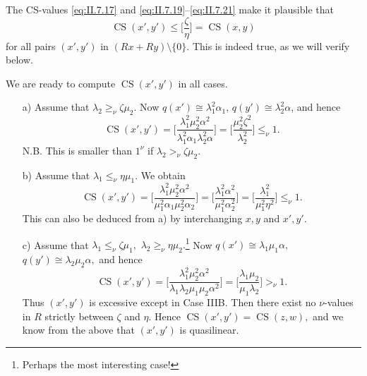 \documentclass [12pt,a4paper,reqno]{amsart}
\begin{document}
The CS-values \eqref{eq:II.7.17} and \eqref{eq:II.7.19}--\eqref{eq:II.7.21} make it plausible that
\begin{equation}\label{eq:II.7.22}
{\operatorname{CS}}(x',y') \leq \bigg[ \frac{\zeta}{\eta} \bigg] = {\operatorname{CS}}(x,y)
\end{equation}
for all pairs $(x',y')$ in $(Rx + Ry) {\setminus} \{ 0 \} .$  This is indeed true, as we will verify below.

{\vskip 1.5mm \noindent}

We are ready to compute  ${\operatorname{CS}}(x', y')$ in all cases.
\begin{enumerate}
  \item[a)] Assume that ${\lambda}_2 {\geq_\nu} {\zeta} \mu_2$. Now $q(x') \cong {\lambda}_1^2 {\alpha}_1$,
  $q(y') \cong {\lambda}_2^2 {\alpha}$, and hence
\begin{equation}\label{eq:II.7.23}
{\operatorname{CS}}(x',y') = \bigg[ \frac{{\lambda}_1 ^2  \mu_2 ^2 {\alpha}^2}{ {\lambda}_1^2 {\alpha}_1 {\lambda}_2^2 {\alpha} } \bigg]  =
\bigg[ \frac{ \mu_2 ^2 {\zeta} ^2}{{\lambda}_2^2 } \bigg] {\leq_\nu} 1.
\end{equation}
 N.B. This is smaller than $1^\nu$ if ${\lambda}_2 {>_\nu} {\zeta} \mu_2.$
{\vskip 1.5mm \noindent}

  \item[b)] Assume that ${\lambda}_1 {\leq_\nu} \eta \mu_1.$ We obtain
\begin{equation}\label{eq:II.7.24}
{\operatorname{CS}}(x',y') = \bigg[ \frac{{\lambda}_1 ^2  \mu_2 ^2 {\alpha}^2}{ \mu_1^2 {\alpha}_1 \mu_2^2 {\alpha}_2 } \bigg]  =
\bigg[ \frac{ {\lambda}_1 ^2 {\alpha} ^2}{\mu_1^2 {\alpha}_2^2 } \bigg] =
\bigg[ \frac{ {\lambda}_1 ^2 }{\mu_1^2 \eta^2 } \bigg] {\leq_\nu} 1.
\end{equation}
This can also be deduced from a) by interchanging $x,y$ and $x',y'$.
{\vskip 1.5mm \noindent}

  \item[c)] Assume that ${\lambda}_1 {\leq_\nu} {\zeta} \mu_1,$ ${\lambda}_2 {\geq_\nu} \eta \mu_2.$\footnote{Perhaps the most interesting case!}
  Now   $q(x') \cong {\lambda}_1 \mu_1 {\alpha} , $  $q(y') \cong {\lambda}_2 \mu_2 {\alpha},$ and hence
\begin{equation}\label{eq:II.7.25}
{\operatorname{CS}}(x',y') = \bigg[ \frac{{\lambda}_1 ^2  \mu_2 ^2 {\alpha}^2}{{\lambda}_1 {\lambda}_2  \mu_1  \mu_2 {\alpha}^2 } \bigg]  =
\bigg[ \frac{ {\lambda}_1 \mu_2 }{\mu_1 {\lambda}_2 } \bigg] {>_\nu} 1.
\end{equation}
Thus $(x',y')$ is excessive except in Case IIIB. Then there exist no $\nu$-values in $R$ strictly between ${\zeta}$ and $\eta$. Hence ${\operatorname{CS}}(x', y') = {\operatorname{CS}}(z,w),$ and we know from the above that $(x',y')$ is quasilinear.
{\vskip 1.5mm \noindent}


\end{enumerate}
\end{document}
